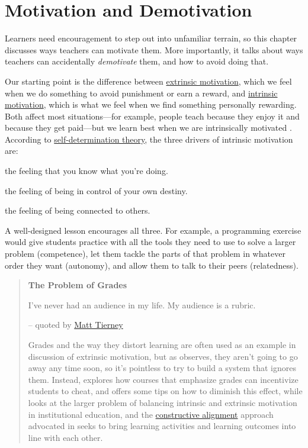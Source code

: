 \chapter{Motivation and Demotivation}\label{s:motivation}

Learners need encouragement to step out into unfamiliar terrain, so this
chapter discusses ways teachers can motivate them. More importantly, it
talks about ways teachers can accidentally \emph{demotivate} them, and how to
avoid doing that.

Our starting point is the difference between \protect\hyperlink{g:extrinsic-motivation}{extrinsic
motivation}, which we feel when we do
something to avoid punishment or earn a reward, and \protect\hyperlink{g:intrinsic-motivation}{intrinsic
motivation}, which is what we feel when we
find something personally rewarding. Both affect most situations---for
example, people teach because they enjoy it and because they get
paid---but we learn best when we are intrinsically motivated
\cite{Wlod2017}. According to \href{https://en.wikipedia.org/wiki/Self-determination\_theory}{self-determination
theory}, the three drivers of intrinsic
motivation are:

\begin{description}
\tightlist
\item[Competence:]
the feeling that you know what you're doing.
\item[Autonomy:]
the feeling of being in control of your own destiny.
\item[Relatedness:]
the feeling of being connected to others.
\end{description}

A well-designed lesson encourages all three. For example, a programming
exercise would give students practice with all the tools they need to
use to solve a larger problem (competence), let them tackle the parts of
that problem in whatever order they want (autonomy), and allow them to
talk to their peers (relatedness).

\begin{quote}\setlength{\parindent}{0pt}
\textbf{The Problem of Grades}

I've never had an audience in my life. My audience is a rubric.

-- quoted by \href{https://twitter.com/figuralities/status/987330064571387906}{Matt Tierney}

Grades and the way they distort learning are often used as an
example in discussion of extrinsic motivation, but as
\cite{Mill2016a} observes, they aren't going to go away any time
soon, so it's pointless to try to build a system that ignores
them. Instead, \cite{Lang2013} explores how courses that
emphasize grades can incentivize students to cheat, and offers some
tips on how to diminish this effect, while \cite{Covi2017} looks
at the larger problem of balancing intrinsic and extrinsic
motivation in institutional education, and the \href{https://en.wikipedia.org/wiki/Constructive\_alignment}{constructive
alignment} approach advocated in
\cite{Bigg2011} seeks to bring learning activities and learning
outcomes into line with each other.
\end{quote}

